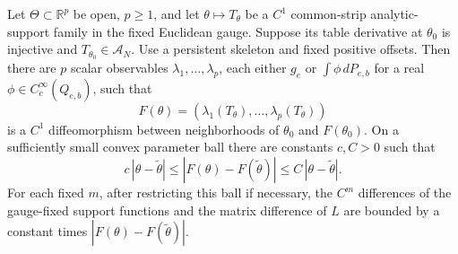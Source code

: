 \begin{theorem}
\label{thm:v48-finite-coordinates}
Let $\Theta\subset\mathbb R^p$ be open, $p\ge1$, and let
$\theta\mapsto T_\theta$ be a $C^1$ common-strip analytic-support family
in the fixed Euclidean gauge.  Suppose its table derivative at
$\theta_0$ is injective and $T_{\theta_0}\in\mathscr A_N$.
Use a persistent skeleton and fixed positive offsets.  Then there are
$p$ scalar observables $\lambda_1,\ldots,\lambda_p$, each either
$g_e$ or $\int\phi\,dP_{e,b}$ for a real
$\phi\in C_c^\infty(Q_{e,b})$, such that
\begin{equation}\label{eq:v48-finite-coordinate-map}
 F(\theta)=(\lambda_1(T_\theta),\ldots,\lambda_p(T_\theta))
\end{equation}
is a $C^1$ diffeomorphism between neighborhoods of $\theta_0$ and
$F(\theta_0)$.  On a sufficiently small convex parameter ball there
are constants $c,C>0$ such that
\begin{equation}\label{eq:v48-local-bilip}
 c\,|\theta-\widetilde\theta|
       \le |F(\theta)-F(\widetilde\theta)|
       \le C\,|\theta-\widetilde\theta|.
\end{equation}
For each fixed $m$, after restricting this ball if necessary, the
$C^m$ differences of the gauge-fixed support functions and the
matrix difference of $L$ are bounded by a constant times
$|F(\theta)-F(\widetilde\theta)|$.
\end{theorem}

